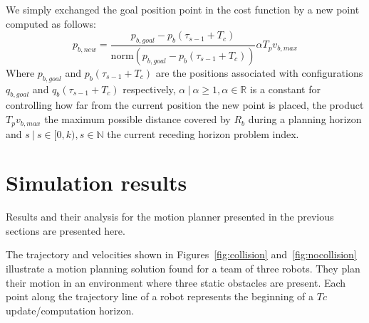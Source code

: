 \documentclass[eprint]{actapoly}
\begin{document}
We simply exchanged the goal position point in the cost function by a new point computed as follows:
$$
    p_{b,new} = \frac{p_{b,goal} - p_{b}(\tau_{s-1}+T_c) }{\mathrm{norm}(p_{b,goal} - p_{b}(\tau_{s-1}+T_c) )} \alpha T_pv_{b,max}
$$
Where $p_{b,goal}$ and $p_{b}(\tau_{s-1}+T_c)$ are the positions associated with configurations $q_{b,goal}$ and $q_{b}(\tau_{s-1}+T_c)$ respectively, $\alpha\ |\ 
\alpha \geq 1, \alpha \in \mathbb{R}$ is a constant for controlling how far from the
current position the new point is placed, the product $T_pv_{b,max}$ the maximum possible distance covered by $R_b$ during a planning horizon and $s\ |\ s \in [0, k), s \in \mathbb{N}$ the current receding horizon problem index.









\section{Simulation results}




Results and their analysis for the motion planner presented in the previous sections are 
presented here.

The trajectory and velocities shown in Figures~\ref{fig:collision} and~\ref{fig:nocollision}
illustrate a motion planning solution found for a team of three robots.
They plan their motion in an environment where three static obstacles are present.
Each point along the trajectory line of a robot represents the beginning
of a $Tc$ update/computation horizon.
\end{document}
